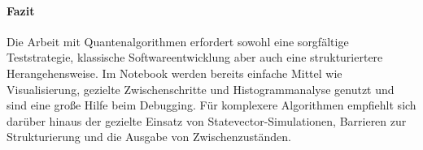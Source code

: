 \paragraph*{Fazit}
\mbox{}

Die Arbeit mit Quantenalgorithmen erfordert sowohl eine sorgfältige Teststrategie, klassische Softwareentwicklung aber auch eine strukturiertere Herangehensweise. Im Notebook werden bereits einfache Mittel wie Visualisierung, gezielte Zwischenschritte und Histogrammanalyse genutzt und sind eine große Hilfe beim Debugging. Für komplexere Algorithmen empfiehlt sich darüber hinaus der gezielte Einsatz von Statevector-Simulationen, Barrieren zur Strukturierung und die Ausgabe von Zwischenzuständen.

\clearpage
\printbibliography
